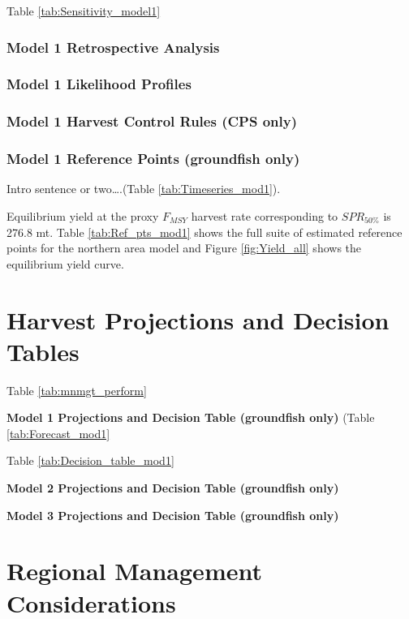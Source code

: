 \documentclass[12pt,]{article}
\begin{document}
Table \ref{tab:Sensitivity_model1}

\subsubsection{Model 1 Retrospective
Analysis}\label{model-1-retrospective-analysis}

\subsubsection{Model 1 Likelihood
Profiles}\label{model-1-likelihood-profiles}

\subsubsection{Model 1 Harvest Control Rules (CPS
only)}\label{model-1-harvest-control-rules-cps-only}

\subsubsection{Model 1 Reference Points (groundfish
only)}\label{model-1-reference-points-groundfish-only}

Intro sentence or two\ldots{}.(Table \ref{tab:Timeseries_mod1}).

Equilibrium yield at the proxy \(F_{MSY}\) harvest rate corresponding to
\(SPR_{50\%}\) is 276.8 mt. Table \ref{tab:Ref_pts_mod1} shows the full
suite of estimated reference points for the northern area model and
Figure \ref{fig:Yield_all} shows the equilibrium yield curve.

\section{Harvest Projections and Decision
Tables}\label{harvest-projections-and-decision-tables}

Table \ref{tab:mnmgt_perform}

\textbf{Model 1 Projections and Decision Table (groundfish only)} (Table
\ref{tab:Forecast_mod1}

Table \ref{tab:Decision_table_mod1}

\textbf{Model 2 Projections and Decision Table (groundfish only)}

\textbf{Model 3 Projections and Decision Table (groundfish only)}

\section{Regional Management
Considerations}\label{regional-management-considerations}
\end{document}
